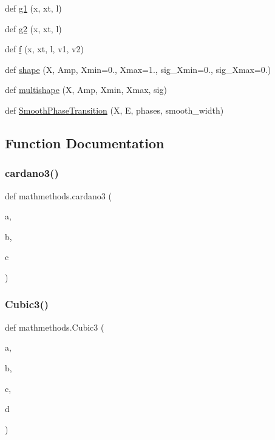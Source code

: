 \begin{DoxyCompactItemize}
\item 
def \hyperlink{namespacemathmethods_a2af85014ee6cf45e45eba4e131714110}{g1} (x, xt, l)
\item 
def \hyperlink{namespacemathmethods_a701fd8e4733e6f1c587540dc29d8729e}{g2} (x, xt, l)
\item 
def \hyperlink{namespacemathmethods_ac945e4655c6b407054fa4553f05f50ef}{f} (x, xt, l, v1, v2)
\item 
def \hyperlink{namespacemathmethods_af17be6ba19612297cd409ccd16f251d1}{shape} (X, Amp, Xmin=0., Xmax=1., sig\+\_\+\+Xmin=0., sig\+\_\+\+Xmax=0.)
\item 
def \hyperlink{namespacemathmethods_a807d5769839d9d7ad1c03740e39085dd}{multishape} (X, Amp, Xmin, Xmax, sig)
\item 
def \hyperlink{namespacemathmethods_a23952fa97f7a35c59be3b94425bd3b1b}{Smooth\+Phase\+Transition} (X, E, phases, smooth\+\_\+width)
\end{DoxyCompactItemize}


\subsection{Function Documentation}
\mbox{\label{namespacemathmethods_a3137142e19831d72cff91377382f1def}} 
\subsubsection{\texorpdfstring{cardano3()}{cardano3()}}
{\footnotesize\ttfamily def mathmethods.\+cardano3 (\begin{DoxyParamCaption}\item[{}]{a,  }\item[{}]{b,  }\item[{}]{c }\end{DoxyParamCaption})}

\mbox{\label{namespacemathmethods_a8543e272b8384b6393e19ce842e2e50f}} 
\subsubsection{\texorpdfstring{Cubic3()}{Cubic3()}}
{\footnotesize\ttfamily def mathmethods.\+Cubic3 (\begin{DoxyParamCaption}\item[{}]{a,  }\item[{}]{b,  }\item[{}]{c,  }\item[{}]{d }\end{DoxyParamCaption})}

